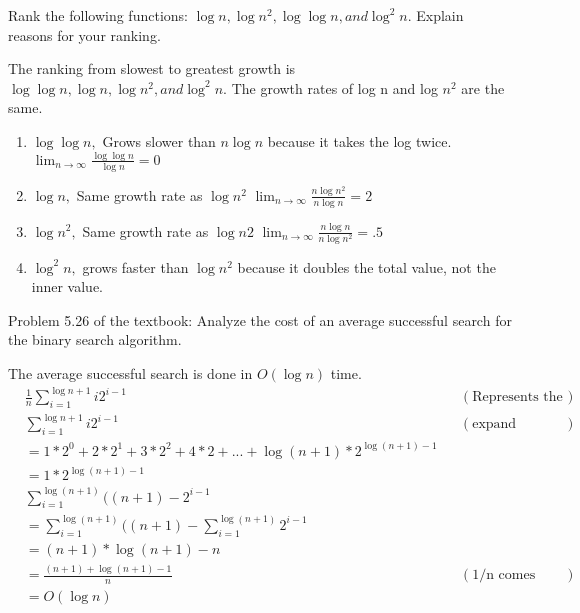 \documentclass[10pt]{article}
\newenvironment{exercise}[2][Exercise]{\begin{trivlist}
\item[\hskip \labelsep {\bfseries #1}\hskip \labelsep {\bfseries #2.}]}{\end{trivlist}}
\newenvironment{solution}[2][Solution]{\begin{trivlist}
\item[\hskip \labelsep {\bfseries #1}\hskip \labelsep {\bfseries #2.}]}{\end{trivlist}}
\theoremstyle{definition}
\begin{document}
\begin{exercise}{(3b)} 
Rank the following functions: $\log n, \log n^2, \log \log n, and \log^2 n$. Explain reasons for
your ranking.
\end{exercise}

\begin{solution}{(3b)}
The ranking from slowest to greatest growth is $\log \log n, \log n, \log {n^2}, and \log^2 n$. The growth rates of log n and log $n^2$ are the same. 
\end{solution}
\begin{enumerate}
  \item $\log \log n,$ Grows slower than $n \log n$ because it takes the log twice. $\lim_{n\to\infty} \frac {\log \log n}{\log n} = 0$
  \item $\log n,$ Same growth rate as $\log n^2$  $\lim_{n\to\infty} \frac {n \log n^2}{n \log n} = 2$
  \item $\log {n^2},$ Same growth rate as $\log n2$  $\lim_{n\to\infty} \frac {n \log n}{n \log n^2} = .5$
  \item $\log^2 n,$ grows faster than $\log n^2$ because it doubles the total value, not the inner value. 
\end{enumerate}

\begin{exercise}{(4)} %
Problem 5.26 of the textbook: Analyze the cost of an average successful search for the binary search
algorithm.
\end{exercise}

\begin{solution}{(4)}
The average successful search is done in $O(\log n)$ time.
\begin{align*}
&\frac{1}{n}\sum_{i=1}^{\log n + 1}i2^{i-1} && (\text{Represents the nodes at each level})\\
&\sum_{i=1}^{\log n + 1}i2^{i-1}  && (\text{expand summation})\\
& = 1*2^0 + 2*2^1 + 3*2^2 + 4 * 2 + ... + \log (n+1) * 2^{\log (n+1)-1}\\
& = 1 * 2^{\log (n+1) -1}\\
&\sum_{i=1}^{\log (n + 1)}((n+1) - 2^{i-1} \\
& = \sum_{i=1}^{\log (n + 1)}((n+1) - \sum_{i=1}^{\log (n + 1)}2^{i-1}\\
& = (n+1) * \log (n+1) - n \\
& = \frac {(n + 1) + \log (n+1) - 1}{n}  && (\text{1/n comes from original equation})\\
& = O(\log n)
\end{align*}
\end{solution}
\end{document}
